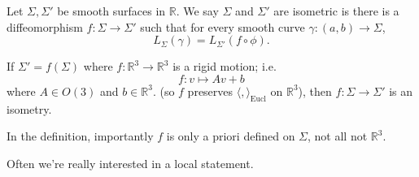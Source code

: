 \leavevmode
\begin{definition}{}{}
    Let \(\Sigma, \Sigma'\) be smooth surfaces in \(\mathbb{R}\). We say \(\Sigma\) and \(\Sigma'\) are isometric is there is a diffeomorphism \(f: \Sigma \to \Sigma'\) such that for every smooth curve \(\gamma: (a,b) \to \Sigma\),
    \[
        L_\Sigma(\gamma) = L_{\Sigma'}(f\circ \phi).
    \]
\end{definition}
\begin{example}
    If \(\Sigma' = f(\Sigma)\) where \(f: \mathbb{R}^3 \to \mathbb{R}^3\) is a rigid motion; i.e.
    \[
        f: v \longmapsto Av + b
    \]
    where \(A \in O(3)\) and \(b \in \mathbb{R}^3\). (so \(f\) preserves \(\langle,\rangle_\text{Eucl}\) on \(\mathbb{R}^3\)), then \(f: \Sigma \to \Sigma'\) is an isometry.
\end{example}
\begin{note}
    In the definition, importantly \(f\) is only a priori defined on \(\Sigma\), not all not \(\mathbb{R}^{3}\).
\end{note}
Often we're really interested in a local statement.

